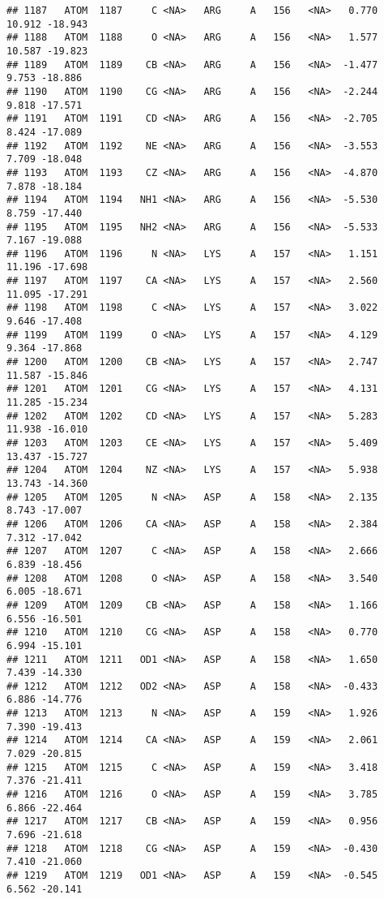\documentclass[
]{article}
\begin{document}
\begin{verbatim}
## 1187   ATOM  1187     C <NA>   ARG     A   156   <NA>   0.770  10.912 -18.943
## 1188   ATOM  1188     O <NA>   ARG     A   156   <NA>   1.577  10.587 -19.823
## 1189   ATOM  1189    CB <NA>   ARG     A   156   <NA>  -1.477   9.753 -18.886
## 1190   ATOM  1190    CG <NA>   ARG     A   156   <NA>  -2.244   9.818 -17.571
## 1191   ATOM  1191    CD <NA>   ARG     A   156   <NA>  -2.705   8.424 -17.089
## 1192   ATOM  1192    NE <NA>   ARG     A   156   <NA>  -3.553   7.709 -18.048
## 1193   ATOM  1193    CZ <NA>   ARG     A   156   <NA>  -4.870   7.878 -18.184
## 1194   ATOM  1194   NH1 <NA>   ARG     A   156   <NA>  -5.530   8.759 -17.440
## 1195   ATOM  1195   NH2 <NA>   ARG     A   156   <NA>  -5.533   7.167 -19.088
## 1196   ATOM  1196     N <NA>   LYS     A   157   <NA>   1.151  11.196 -17.698
## 1197   ATOM  1197    CA <NA>   LYS     A   157   <NA>   2.560  11.095 -17.291
## 1198   ATOM  1198     C <NA>   LYS     A   157   <NA>   3.022   9.646 -17.408
## 1199   ATOM  1199     O <NA>   LYS     A   157   <NA>   4.129   9.364 -17.868
## 1200   ATOM  1200    CB <NA>   LYS     A   157   <NA>   2.747  11.587 -15.846
## 1201   ATOM  1201    CG <NA>   LYS     A   157   <NA>   4.131  11.285 -15.234
## 1202   ATOM  1202    CD <NA>   LYS     A   157   <NA>   5.283  11.938 -16.010
## 1203   ATOM  1203    CE <NA>   LYS     A   157   <NA>   5.409  13.437 -15.727
## 1204   ATOM  1204    NZ <NA>   LYS     A   157   <NA>   5.938  13.743 -14.360
## 1205   ATOM  1205     N <NA>   ASP     A   158   <NA>   2.135   8.743 -17.007
## 1206   ATOM  1206    CA <NA>   ASP     A   158   <NA>   2.384   7.312 -17.042
## 1207   ATOM  1207     C <NA>   ASP     A   158   <NA>   2.666   6.839 -18.456
## 1208   ATOM  1208     O <NA>   ASP     A   158   <NA>   3.540   6.005 -18.671
## 1209   ATOM  1209    CB <NA>   ASP     A   158   <NA>   1.166   6.556 -16.501
## 1210   ATOM  1210    CG <NA>   ASP     A   158   <NA>   0.770   6.994 -15.101
## 1211   ATOM  1211   OD1 <NA>   ASP     A   158   <NA>   1.650   7.439 -14.330
## 1212   ATOM  1212   OD2 <NA>   ASP     A   158   <NA>  -0.433   6.886 -14.776
## 1213   ATOM  1213     N <NA>   ASP     A   159   <NA>   1.926   7.390 -19.413
## 1214   ATOM  1214    CA <NA>   ASP     A   159   <NA>   2.061   7.029 -20.815
## 1215   ATOM  1215     C <NA>   ASP     A   159   <NA>   3.418   7.376 -21.411
## 1216   ATOM  1216     O <NA>   ASP     A   159   <NA>   3.785   6.866 -22.464
## 1217   ATOM  1217    CB <NA>   ASP     A   159   <NA>   0.956   7.696 -21.618
## 1218   ATOM  1218    CG <NA>   ASP     A   159   <NA>  -0.430   7.410 -21.060
## 1219   ATOM  1219   OD1 <NA>   ASP     A   159   <NA>  -0.545   6.562 -20.141

\end{verbatim}
\end{document}
